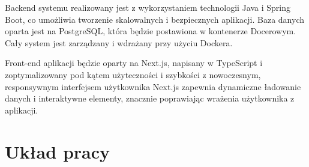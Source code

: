 Backend systemu realizowany jest z wykorzystaniem technologii Java i Spring Boot, co umożliwia tworzenie skalowalnych i bezpiecznych aplikacji. Baza danych oparta jest na PostgreSQL, która będzie postawiona w kontenerze Docerowym. Cały system jest zarządzany i wdrażany przy użyciu Dockera.

Front-end aplikacji będzie oparty na Next.js, napisany w TypeScript i zoptymalizowany pod kątem użyteczności i szybkości z nowoczesnym, responsywnym interfejsem użytkownika Next.js zapewnia dynamiczne ładowanie danych i interaktywne elementy, znacznie poprawiając wrażenia użytkownika z aplikacji.


\section{Układ pracy}
